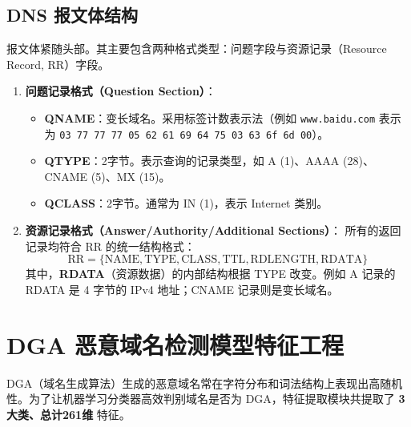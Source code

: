 \documentclass[11pt,a4paper]{ctexart}
\begin{document}
\subsection{DNS 报文体结构}
报文体紧随头部。其主要包含两种格式类型：问题字段与资源记录（Resource Record, RR）字段。
\begin{enumerate}
    \item \textbf{问题记录格式（Question Section）}：
    \begin{itemize}
        \item \textbf{QNAME}：变长域名。采用标签计数表示法（例如 \texttt{www.baidu.com} 表示为 \texttt{03 77 77 77 05 62 61 69 64 75 03 63 6f 6d 00}）。
        \item \textbf{QTYPE}：2字节。表示查询的记录类型，如 A (1)、AAAA (28)、CNAME (5)、MX (15)。
        \item \textbf{QCLASS}：2字节。通常为 IN (1)，表示 Internet 类别。
    \end{itemize}
    \item \textbf{资源记录格式（Answer/Authority/Additional Sections）}：
    所有的返回记录均符合 RR 的统一结构格式：
    $$\text{RR} = \{ \text{NAME}, \text{TYPE}, \text{CLASS}, \text{TTL}, \text{RDLENGTH}, \text{RDATA} \}$$
    其中，\textbf{RDATA}（资源数据）的内部结构根据 TYPE 改变。例如 A 记录的 RDATA 是 4 字节的 IPv4 地址；CNAME 记录则是变长域名。
\end{enumerate}

\newpage

\section{DGA 恶意域名检测模型特征工程}
DGA（域名生成算法）生成的恶意域名常在字符分布和词法结构上表现出高随机性。为了让机器学习分类器高效判别域名是否为 DGA，特征提取模块共提取了 \textbf{3大类、总计261维} 特征。
\end{document}
